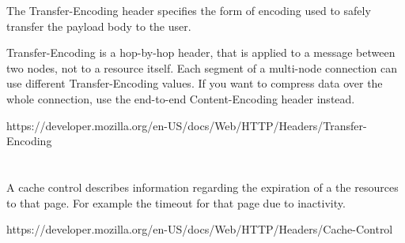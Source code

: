 \documentclass{article}
\begin{document}
	The Transfer-Encoding header specifies the form of encoding used to safely transfer the payload body to the user.

	Transfer-Encoding is a hop-by-hop header, that is applied to a message between two nodes, not to a resource itself. Each segment of a multi-node connection can use different Transfer-Encoding values. If you want to compress data over the whole connection, use the end-to-end Content-Encoding header instead.

	https://developer.mozilla.org/en-US/docs/Web/HTTP/Headers/Transfer-Encoding

	\section{}
	A cache control describes information regarding the expiration of a the resources to that page. For example the timeout for that page due to inactivity.
	
	https://developer.mozilla.org/en-US/docs/Web/HTTP/Headers/Cache-Control

	\newpage
\end{document}
